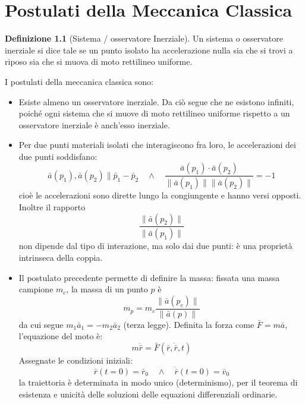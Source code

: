 \documentclass[11pt, a4paper, openright]{book}
\theoremstyle{plain}
\theoremstyle{definition}
\newtheorem{definizione}[teorema]{Definizione}
\theoremstyle{remark}
\begin{document}
\chapter{Postulati della Meccanica Classica}
\begin{definizione}[Sistema / osservatore Inerziale]
    Un sistema o osservatore inerziale si dice tale se un punto isolato ha accelerazione nulla sia che si trovi a riposo sia che si muova di moto rettilineo uniforme.
\end{definizione}
I postulati della meccanica classica sono:
\begin{itemize}
    \item Esiste almeno un osservatore inerziale. Da ciò segue che ne esistono infiniti, poiché ogni sistema che si muove di moto rettilineo uniforme rispetto a un osservatore inerziale è anch'esso inerziale.
    \item Per due punti materiali isolati che interagiscono fra loro, le accelerazioni dei due punti soddisfano:
    \begin{equation}
        \bar{a}(p_1), \bar{a}(p_2) \parallel \bar{p}_1 - \bar{p}_2 \quad \wedge \quad \frac{\bar{a}(p_1) \cdot \bar{a}(p_2)}{\|\bar{a}(p_1)\|\|\bar{a}(p_2)\|} = -1
    \end{equation}
    cioè le accelerazioni sono dirette lungo la congiungente e hanno versi opposti. Inoltre il rapporto
    \begin{equation}
        \frac{\|\bar{a}(p_2)\|}{\|\bar{a}(p_1)\|}
    \end{equation}
    non dipende dal tipo di interazione, ma solo dai due punti: è una proprietà intrinseca della coppia.
    \item Il postulato precedente permette di definire la massa: fissata una massa campione $m_c$, la massa di un punto $p$ è
    \begin{equation}
        m_p = m_c \frac{\|\bar{a}(p_c)\|}{\|\bar{a}(p)\|}
    \end{equation}
    da cui segue $m_1\bar{a}_1 = -m_2\bar{a}_2$ (terza legge). Definita la forza come $\bar{F} = m\bar{a}$, l'equazione del moto è:
    \begin{equation}
        m\ddot{\bar{r}} = \bar{F}(\bar{r}, \dot{\bar{r}}, t)
    \end{equation}
    Assegnate le condizioni iniziali:
    \begin{equation}
        \bar{r}(t = 0) = \bar{r}_0 \quad \wedge \quad \dot{\bar{r}}(t = 0) = \bar{v}_0
    \end{equation}
    la traiettoria è determinata in modo unico (determinismo), per il teorema di esistenza e unicità delle soluzioni delle equazioni differenziali ordinarie.
\end{itemize}
\end{document}
